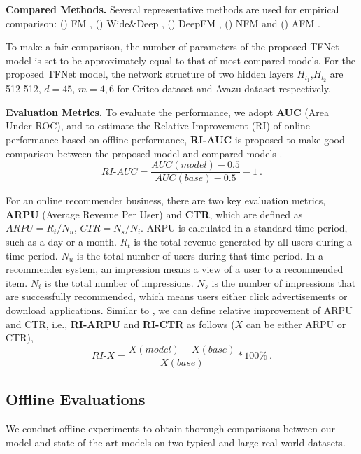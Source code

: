 \documentclass[sigconf]{acmart}
\begin{document}
\textbf{Compared Methods.} Several representative methods are used for empirical comparison: () {FM} \cite{rendle2012factorization} , () {Wide\&Deep} \cite{cheng2016wide} , () {DeepFM} \cite{guo2017deepfm} , () {NFM} \cite{he2017neural} and () {AFM} \cite{xiao2017attentional}.

To make a fair comparison, the number of parameters of the proposed TFNet model is set to be approximately equal to that of most compared models. For the proposed TFNet model, the network structure of two hidden layers $H_{l_1}$,$H_{l_2}$ are 512-512, $d=45$, $m=4,6$ for Criteo dataset and Avazu dataset respectively. 

\textbf{Evaluation Metrics.} 
To evaluate the performance, we adopt \textbf{AUC} (Area Under ROC), and to estimate the Relative Improvement (RI) of online performance based on offline performance, \textbf{RI-AUC} is proposed to make good comparison between the proposed model and compared models \cite{chan2018convolutional}. 
\begin{equation}
\textit{RI}\text{-}\textit{AUC} = \dfrac {\textit{AUC}(model)-0.5}{\textit{AUC}(base)-0.5} -1~.
\end{equation}

For an online recommender business, there are two key evaluation metrics, \textbf{ARPU} (Average Revenue Per User) and \textbf{CTR}, which are defined as $\textit{ARPU} = R_t/N_u$, $\textit{CTR} = N_s/N_i$. ARPU is calculated in a standard time period, such as a day or a month. $R_t$ is the total revenue generated by all users during a time period. $N_u$ is the total number of users during that time period. In a recommender system, an impression means a view of a user to a recommended item. $N_i$ is the total number of impressions. $N_s$ is the number of impressions that are successfully recommended, which means users either click advertisements or download applications. Similar to \cite{qu2018product}, we can define relative improvement of ARPU and CTR, i.e., \textbf{RI-ARPU} and \textbf{RI-CTR} as follows ($X$ can be either ARPU or CTR),
\begin{equation}
\textit{RI}\text{-}\textit{X} = \dfrac {\textit{X}(model)-\textit{X}(base)}{\textit{X}(base)} *100\%~.
\end{equation}


\subsection{Offline Evaluations}
We conduct offline experiments to obtain thorough comparisons between our model and state-of-the-art models on two typical and large real-world datasets.\\
\end{document}

